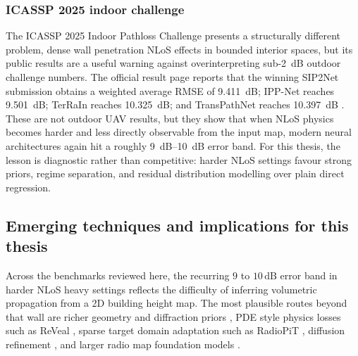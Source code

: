 \subsubsection{ICASSP 2025 indoor challenge}

The ICASSP 2025 Indoor Pathloss Challenge \cite{icassp2025indoor} presents a
structurally different problem, dense wall penetration NLoS effects in bounded
interior spaces, but its public results are a useful warning against
overinterpreting sub-\SI{2}{dB} outdoor challenge numbers.  The official result
page reports that the winning SIP2Net submission obtains a weighted average RMSE
of \SI{9.411}{dB}; IPP-Net reaches \SI{9.501}{dB}; TerRaIn reaches
\SI{10.325}{dB}; and TransPathNet reaches \SI{10.397}{dB}
\cite{indoor2025results,sip2net2025,ippnet2025,transPathNet2025}.  These are
not outdoor UAV results, but they show that when NLoS physics becomes harder
and less directly observable from the input map, modern neural architectures
again hit a roughly \SIrange{9}{10}{dB} error band. For this thesis, the
lesson is diagnostic rather than competitive: harder NLoS settings favour
strong priors, regime separation, and residual distribution modelling over
plain direct regression.

\subsection{Emerging techniques and implications for this thesis}
\label{sec:soa_emerging}
\label{sec:soa_position}

Across the benchmarks reviewed here, the recurring $9$ to
$10\,\mathrm{dB}$ error band in harder NLoS heavy settings reflects the
difficulty of inferring volumetric propagation from a 2D building height map.
The most plausible routes beyond that wall are richer geometry and
diffraction priors \cite{geomDL2024}, PDE style physics losses such as ReVeal
\cite{reveal2025}, sparse target domain adaptation such as RadioPiT
\cite{radiopit2025}, diffusion refinement \cite{radiodiff2025}, and larger
radio map foundation models \cite{fmrme2026}.

